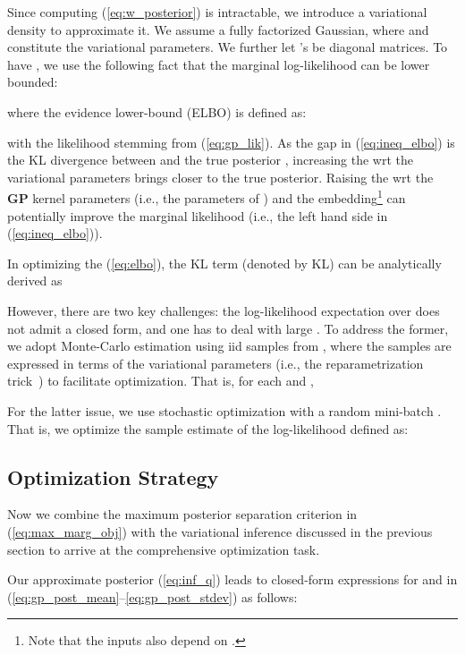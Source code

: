 \documentclass[10pt,letterpaper]{article}
\begin{document}
Since computing (\ref{eq:w_posterior}) is intractable, we introduce a variational density  to approximate it. We assume a fully factorized Gaussian, 
where  and  constitute the variational parameters. We further let 's be diagonal matrices. To have , we use the following fact that the marginal log-likelihood can be lower bounded: \vspace{+0.5em}

where the evidence lower-bound (ELBO) is defined as:
\vspace{+0.5em}

with the likelihood stemming from (\ref{eq:gp_lik}).
As the gap in (\ref{eq:ineq_elbo}) is the KL divergence between  and the true posterior , increasing the  wrt the variational parameters  brings  closer to the true posterior. 
Raising the  wrt the \textbf{GP} kernel parameters (i.e., the parameters of ) and the embedding\footnote{Note that the inputs  also depend on .}  can potentially improve the marginal likelihood (i.e., the left hand side in (\ref{eq:ineq_elbo})). 

In optimizing the  (\ref{eq:elbo}), the KL term (denoted by KL) can be analytically derived as 

However, there are two key challenges: the log-likelihood expectation over  does not admit a closed form, and one has to deal with large . To address the former, we adopt Monte-Carlo estimation using  iid samples  from , where the samples are expressed in terms of the variational parameters (i.e., the reparametrization trick~\cite{vae14}) to facilitate optimization. That is, for each  and , 
\vspace{+0.5em}

For the latter issue, we use stochastic optimization with a random mini-batch . That is, we optimize the sample estimate of the log-likelihood defined as:





\subsection{Optimization Strategy}\label{sec:final_optim}

Now we combine the maximum posterior separation criterion in (\ref{eq:max_marg_obj}) with the variational inference discussed in the previous section to arrive at the comprehensive optimization task.

Our approximate posterior (\ref{eq:inf_q}) leads to closed-form expressions for  and  in (\ref{eq:gp_post_mean}--\ref{eq:gp_post_stdev}) as follows: 
\vspace{+0.5em}
\end{document}
